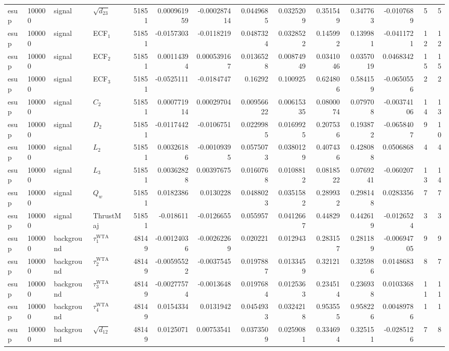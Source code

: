 \begin{landscape}
\begin{longtable}{llll r rrrr rr r rr}
esup & 100000 & signal & $\sqrt{d_{23}}$ & 51851 & 0.000961959 & -0.000287414 & 0.0449685 & 0.0325209 & 0.351549 & 0.347763 & -0.0107689 & 5 & 5 \\
esup & 100000 & signal & ECF$_1$ & 51851 & -0.0157303 & -0.0118219 & 0.0487324 & 0.0328522 & 0.145992 & 0.139981 & -0.0411721 & 12 & 12 \\
esup & 100000 & signal & ECF$_2$ & 51851 & 0.00114394 & 0.000539167 & 0.0136528 & 0.00874949 & 0.0341046 & 0.0357019 & 0.0468342 & 15 & 15 \\
esup & 100000 & signal & ECF$_3$ & 51851 & -0.0525111 & -0.0184747 & 0.16292 & 0.100925 & 0.624806 & 0.584159 & -0.0650556 & 2 & 2 \\
esup & 100000 & signal & $C_2$ & 51851 & 0.000771914 & 0.00029704 & 0.00956622 & 0.00615335 & 0.0800074 & 0.079708 & -0.00374106 & 14 & 13 \\
esup & 100000 & signal & $D_2$ & 51851 & -0.0117442 & -0.0106751 & 0.0229985 & 0.0169925 & 0.207536 & 0.193872 & -0.0658407 & 9 & 10 \\
esup & 100000 & signal & $L_2$ & 51851 & 0.00326186 & -0.00109395 & 0.0575073 & 0.0380129 & 0.407436 & 0.428088 & 0.0506868 & 4 & 4 \\
esup & 100000 & signal & $L_3$ & 51851 & 0.00362828 & 0.00397675 & 0.0160768 & 0.0108812 & 0.0818522 & 0.0769241 & -0.060207 & 13 & 14 \\
esup & 100000 & signal & $Q_w$ & 51851 & 0.0182386 & 0.0130228 & 0.0488023 & 0.0351582 & 0.289932 & 0.298148 & 0.0283356 & 7 & 7 \\
esup & 100000 & signal & ThrustMaj & 51851 & -0.018611 & -0.0126655 & 0.055957 & 0.0412667 & 0.44829 & 0.442619 & -0.0126524 & 3 & 3 \\
esup & 100000 & background & $\tau_1^{\mathrm{WTA}}$ & 48149 & -0.00124036 & -0.00262269 & 0.020221 & 0.012943 & 0.283157 & 0.281189 & -0.00694705 & 9 & 9 \\
esup & 100000 & background & $\tau_2^{\mathrm{WTA}}$ & 48149 & -0.00595522 & -0.0037545 & 0.0197887 & 0.0133459 & 0.32121 & 0.325986 & 0.0148683 & 8 & 7 \\
esup & 100000 & background & $\tau_3^{\mathrm{WTA}}$ & 48149 & -0.00277574 & -0.0013648 & 0.0197684 & 0.0125363 & 0.234514 & 0.236938 & 0.0103368 & 11 & 11 \\
esup & 100000 & background & $\tau_4^{\mathrm{WTA}}$ & 48149 & 0.0154334 & 0.0131942 & 0.0454933 & 0.0324218 & 0.953555 & 0.958226 & 0.00489786 & 1 & 1 \\
esup & 100000 & background & $\sqrt{d_{12}}$ & 48149 & 0.0125071 & 0.00753541 & 0.0373509 & 0.0259081 & 0.334694 & 0.325151 & -0.0285126 & 7 & 8 \\

\end{longtable}
\end{landscape}
